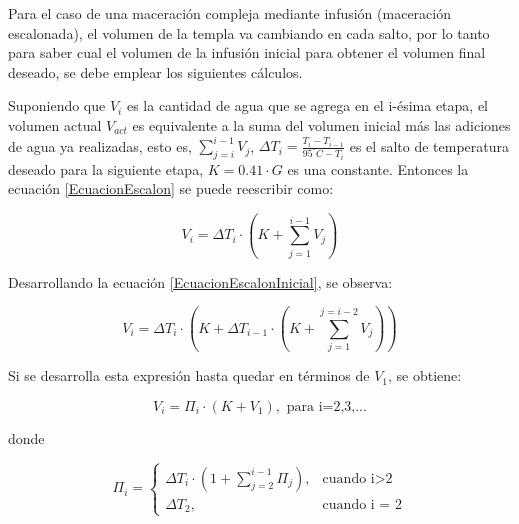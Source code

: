 \begin{itemize}
                \par Para el caso de una maceración compleja mediante infusión (maceración escalonada), el volumen de la templa va cambiando en cada salto, por lo tanto para saber cual el volumen de la infusión inicial para obtener el volumen final deseado, se debe emplear los siguientes cálculos.
                
                \par Suponiendo que $V_i$ es la cantidad de agua que se agrega en el i-ésima etapa, el volumen actual $V_{act}$ es equivalente a la suma del volumen inicial más las adiciones de agua ya realizadas, esto es, $\sum_{j=i}^{i-1} V_j$, $\Delta T_{i} = \frac{T_i - T_{i-1}}{95^{\circ}C - T_i}$ es el salto de temperatura deseado para la siguiente etapa,  $K=0.41 \cdot G$ es una constante. Entonces la ecuación \ref{EcuacionEscalon} se puede reescribir como:
                
                \begin{equation}
                    V_{i} = \Delta T_{i} \cdot (K + \sum_{j=1}^{i-1} V_j )
                    \label{EcuacionEscalonInicial}
                \end{equation}
                
                \par Desarrollando la ecuación \ref{EcuacionEscalonInicial}, se observa:
                
                \begin{equation}
                    V_{i} = \Delta T_{i} \cdot (K + \Delta T_{i-1} \cdot (K + \sum_{j=1}^{j = i-2} V_j))
                \end{equation}
                
                \par Si se desarrolla esta expresión hasta quedar en términos de $V_1$, se obtiene:
                
                \begin{equation}
                    V_i = \Pi_i \cdot(K + V_1), \text{ para i=2,3,...}
                \label{EcuacionEscalonadaPi}
                \end{equation}
                \par donde
                
                $$ \Pi_i = 
                \begin{cases}
                \Delta T_i \cdot (1 + \sum_{j=2}^{i-1} \Pi_j), & \text{cuando i>2} \\
                \Delta T_2, & \text{cuando i = 2}
                \end{cases}
                $$
                

\end{itemize}
